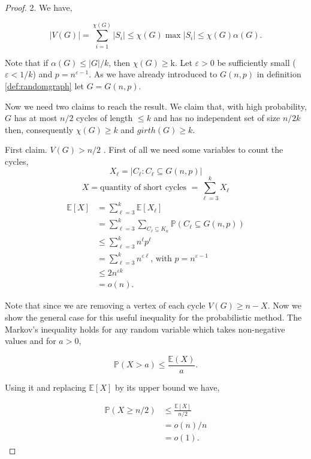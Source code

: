 \documentclass[12pt,twoside,a4paper,bibliography=totocnumbered]{book}
\numberwithin{equation}{section}
\theoremstyle{remark}
\begin{document}
\begin{proof}2.
We have,

$$ |V(G)| = \sum_{i=1}^{\chi(G)} |S_i| \leq \chi(G)\max|S_i| \leq \chi(G) \alpha (G) .$$

Note that if $\alpha(G) \leq |G|/k$, then $\chi(G) \geq $k. Let $\varepsilon > 0$ be sufficiently small ($\varepsilon < 1/k$) and $p = n^{\varepsilon - 1}$. As we have already introduced to $G(n,p)$ in definition \ref{def:randomgraph} let $G = G(n,p) $.%

Now we need two claims to reach the result. We claim that, with high probability, $G$ has at most $n/2$ cycles of length $\leq k$ and has no independent set  of size $n/2k$ then, consequently $\chi(G) \geq k$ and $girth(G) \geq k$.

First claim. $V(G) > n/2$ . First of all we need some variables to count the cycles,
$$X_{\ell} =  |C_{\ell} \colon C_{\ell} \subseteq G(n,p)|$$
$$X = \text{quantity of short cycles } = \sum_{{\ell}=3}^k X_{\ell}$$
\begin{align*}
\mathbb{E}[X] &= \sum_{{\ell}=3}^k \mathbb{E}[X_{\ell}] \\
	       &= \sum_{{\ell}=3}^k \sum_{C_{\ell} \subseteq K_n} \mathbb{P}(C_{\ell} \subseteq G(n,p))\\
	       &\leq \sum_{{\ell}=3}^k n^{\ell} p^{\ell} \\
	       &= \sum_{{\ell}=3}^k n^{\varepsilon {\ell}}\text{, with } p= n^{\varepsilon - 1}\\
	       &\leq 2n^{\varepsilon k} \\
	       &= o(n).
\end{align*}

Note that since we are removing a vertex of each cycle $V(G) \geq n-X$. Now we show the general case for this useful inequality for the probabilistic method. The Markov's inequality holds for any random variable which takes non-negative values and for $a>0$,

$$\mathbb{P}(X>a) \leq \frac{\mathbb{E}(X)}{a}.$$

Using it and replacing $\mathbb{E}[X]$ by its upper bound we have,

\begin{align*}
\mathbb{P}(X\geq n/2) &\leq \frac{\mathbb{E}[X]}{n/2}\\
		& = o(n)/n\\
		& = o(1).
\end{align*}


\end{proof}
\end{document}
